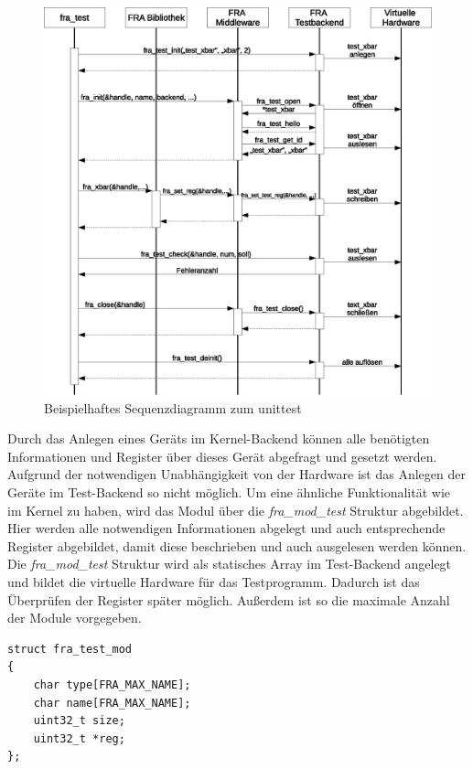\begin{figure}[!hbtp]
	\centering
	\includegraphics[width = \linewidth]{pictures/2020-01-16-testbackend.eps}
	\smallskip
	\caption{Beispielhaftes Sequenzdiagramm zum \gls{unittest}}
	\label{fig:testbackend}
\end{figure} 


Durch das Anlegen eines Geräts im Kernel-Backend können alle benötigten Informationen und Register über dieses Gerät abgefragt und gesetzt werden. Aufgrund der notwendigen Unabhängigkeit von der Hardware ist das Anlegen der Geräte im Test-Backend so nicht möglich. Um eine ähnliche Funktionalität wie im Kernel zu haben, wird das Modul über die \textit{fra\_mod\_test} Struktur abgebildet. Hier werden alle notwendigen Informationen abgelegt und auch entsprechende Register abgebildet, damit diese beschrieben und auch ausgelesen werden können.
Die \textit{fra\_mod\_test} Struktur wird als statisches Array im Test-Backend angelegt und bildet die virtuelle Hardware für das Testprogramm. Dadurch ist das Überprüfen der Register später möglich. Außerdem ist so die maximale Anzahl der Module vorgegeben. 


\begin{lstfloat}
\begin{lstlisting}
struct fra_test_mod
{
	char type[FRA_MAX_NAME];
	char name[FRA_MAX_NAME];
	uint32_t size;
	uint32_t *reg;
};
\end{lstlisting}
\end{lstfloat}

